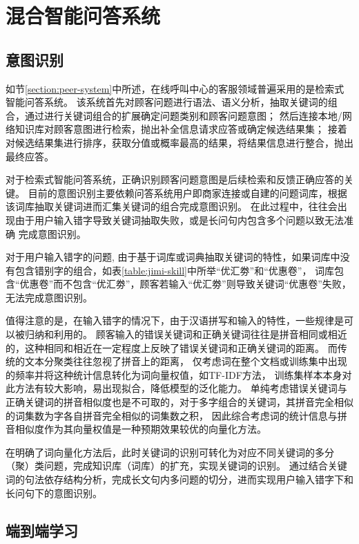 \section{混合智能问答系统}
\label{section:mixed-system}

\subsection{意图识别}
\label{subsection:task-recognition}

如节\ref{section:peer-system}中所述，在线呼叫中心的客服领域普遍采用的是检索式智能问答系统。
该系统首先对顾客问题进行语法、语义分析，抽取关键词的组合，通过进行关键词组合的扩展确定问题类别和顾客问题意图；
然后连接本地/网络知识库对顾客意图进行检索，抛出补全信息请求应答或确定候选结果集；
接着对候选结果集进行排序，获取分值或概率最高的结果，将结果信息进行整合，抛出最终应答。

对于检索式智能问答系统，正确识别顾客问题意图是后续检索和反馈正确应答的关键。
目前的意图识别主要依赖问答系统用户即商家连接或自建的问题词库，根据该词库抽取关键词进而汇集关键词的组合完成意图识别。
在此过程中，往往会出现由于用户输入错字导致关键词抽取失败，或是长问句内包含多个问题以致无法准确
完成意图识别。

对于用户输入错字的问题,
由于基于词库或词典抽取关键词的特性，如果词库中没有包含错别字的组合，如表\ref{table:jimi-skill}中所举“优汇劵”和“优惠卷”，
词库包含“优惠卷”而不包含“优汇劵”，顾客若输入“优汇劵”则导致关键词“优惠卷”失败，无法完成意图识别。

值得注意的是，在输入错字的情况下，由于汉语拼写和输入的特性，一些规律是可以被归纳和利用的。
顾客输入的错误关键词和正确关键词往往是拼音相同或相近的，这种相同和相近在一定程度上反映了错误关键词和正确关键词的距离。
而传统的文本分聚类往往忽视了拼音上的距离，
仅考虑词在整个文档或训练集中出现的频率并将这种统计信息转化为词向量权值，如TF-IDF方法，
训练集样本本身对此方法有较大影响，易出现拟合，降低模型的泛化能力。
单纯考虑错误关键词与正确关键词的拼音相似度也是不可取的，对于多字组合的关键词，其拼音完全相似的词集数为字各自拼音完全相似的词集数之积，
因此综合考虑词的统计信息与拼音相似度作为其向量权值是一种预期效果较优的向量化方法。

在明确了词向量化方法后，此时关键词的识别可转化为对应不同关键词的多分（聚）类问题，完成知识库（词库）的扩充，实现关键词的识别。
通过结合关键词的句法依存结构分析\citep{问题识别}，完成长文句内多问题的切分，进而实现用户输入错字下和长问句下的意图识别。

\subsection{端到端学习}


